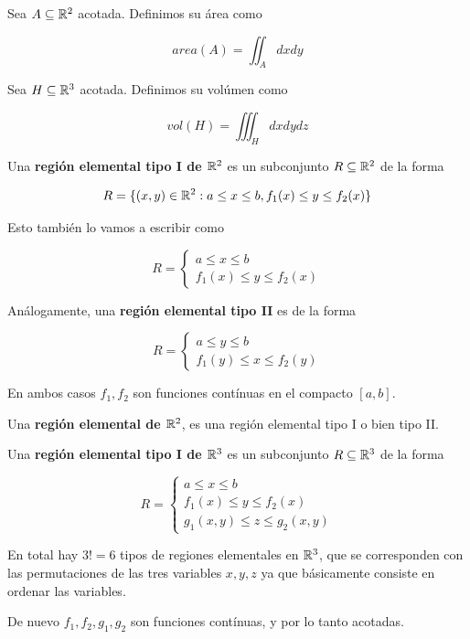 \begin{definition}
Sea $A \subseteq \mathbb{R}^2$ acotada.  Definimos su área como

$$ area(A) = \iint_A dxdy $$

Sea $H \subseteq \mathbb{R}^3$ acotada.  Definimos su volúmen como

$$ vol(H) = \iiint_H dxdydz $$
\end{definition}

\begin{definition} 
Una \textbf{región elemental tipo I de $\mathbb{R}^2$} es un subconjunto $ R \subseteq \mathbb{R}^2$ de la forma

$$ R = \{(x,y) \in \mathbb{R}^2 : a \leq x \leq b, f_1(x) \leq y \leq f_2(x) \} $$

Esto también lo vamos a escribir como

$$ R = \begin{cases} a \leq x \leq b \\ f_1(x) \leq y \leq f_2(x) \end{cases}$$

Análogamente, una \textbf{región elemental tipo II} es de la forma

$$ R = \begin{cases} a \leq y \leq b \\ f_1(y) \leq x \leq f_2(y) \end{cases}$$

En ambos casos $f_1, f_2$ son funciones contínuas en el compacto $[a,b]$.

Una \textbf{región elemental de $\mathbb{R}^2$}, es una región elemental tipo I o bien tipo II.


Una \textbf{región elemental tipo I de $\mathbb{R}^3$} es un subconjunto $ R \subseteq \mathbb{R}^3$ de la forma

$$ R = \begin{cases} a \leq x \leq b \\ f_1(x) \leq y \leq f_2(x) \\ g_1(x,y) \leq z \leq g_2(x,y) \end{cases}$$

En total hay $3! = 6$ tipos de regiones elementales en $ \mathbb{R}^3$, que se corresponden con las permutaciones de las tres variables $x,y,z$ ya que básicamente consiste en ordenar las variables.

De nuevo $ f_1, f_2, g_1, g_2$ son funciones contínuas, y por lo tanto acotadas.
\end{definition}

